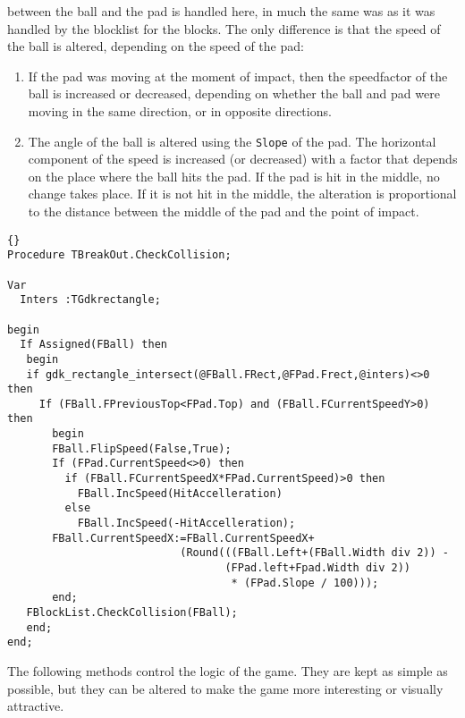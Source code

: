 \documentclass[10pt]{article}
\newcommand{\var}[1]{\texttt{#1}}
\begin{document}
between the ball and the pad is handled here, in much the same was as it was handled
by the blocklist for the blocks. The only difference is that the speed of the ball 
is altered, depending on the speed of the pad:
\begin{enumerate}
\item If the pad was moving at the moment of impact, then the speedfactor of
the ball is increased or decreased, depending on whether the ball and pad
 were moving in the same direction, or in opposite directions.
\item The angle of the ball is altered using the \var{Slope} of the pad. The horizontal
component of the speed is increased (or decreased) with a factor that depends on
the place where the ball hits the pad. If the pad is hit in the middle, no change takes
place. If it is not hit in the middle, the alteration is proportional to the distance
between the middle of the pad and the point of impact.
\end{enumerate}
\begin{lstlisting}{}
Procedure TBreakOut.CheckCollision;

Var
  Inters :TGdkrectangle;

begin
  If Assigned(FBall) then
   begin
   if gdk_rectangle_intersect(@FBall.FRect,@FPad.Frect,@inters)<>0 then
     If (FBall.FPreviousTop<FPad.Top) and (FBall.FCurrentSpeedY>0) then
       begin
       FBall.FlipSpeed(False,True);
       If (FPad.CurrentSpeed<>0) then
         if (FBall.FCurrentSpeedX*FPad.CurrentSpeed)>0 then
           FBall.IncSpeed(HitAccelleration)
         else
           FBall.IncSpeed(-HitAccelleration);
       FBall.CurrentSpeedX:=FBall.CurrentSpeedX+
                           (Round(((FBall.Left+(FBall.Width div 2)) - 
                                  (FPad.left+Fpad.Width div 2)) 
                                   * (FPad.Slope / 100)));
       end; 
   FBlockList.CheckCollision(FBall);  
   end;
end;
\end{lstlisting}
The following methods control the logic of the game. They are kept as simple
as possible, but they can be altered to make the game more interesting or 
visually attractive.
\end{document}
